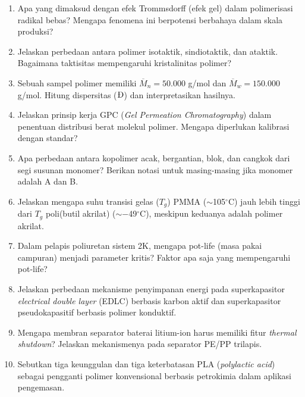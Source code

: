 \documentclass[12pt,a4paper,openany]{book}
\begin{document}
\begin{enumerate}

\item Apa yang dimaksud dengan efek Trommsdorff (efek gel) dalam polimerisasi radikal bebas? Mengapa fenomena ini berpotensi berbahaya dalam skala produksi?

\item Jelaskan perbedaan antara polimer isotaktik, sindiotaktik, dan ataktik. Bagaimana taktisitas mempengaruhi kristalinitas polimer?

\item Sebuah sampel polimer memiliki $\overline{M}_n = 50.000$ g/mol dan $\overline{M}_w = 150.000$ g/mol. Hitung dispersitas ($\text{\DH}$) dan interpretasikan hasilnya.

\item Jelaskan prinsip kerja GPC (\textit{Gel Permeation Chromatography}) dalam penentuan distribusi berat molekul polimer. Mengapa diperlukan kalibrasi dengan standar?

\item Apa perbedaan antara kopolimer acak, bergantian, blok, dan cangkok dari segi susunan monomer? Berikan notasi untuk masing-masing jika monomer adalah A dan B.

\item Jelaskan mengapa suhu transisi gelas ($T_g$) PMMA ($\sim$105$^{\circ}$C) jauh lebih tinggi dari $T_g$ poli(butil akrilat) ($\sim -$49$^{\circ}$C), meskipun keduanya adalah polimer akrilat.

\item Dalam pelapis poliuretan sistem 2K, mengapa pot-life (masa pakai campuran) menjadi parameter kritis? Faktor apa saja yang mempengaruhi pot-life?

\item Jelaskan perbedaan mekanisme penyimpanan energi pada superkapasitor \textit{electrical double layer} (EDLC) berbasis karbon aktif dan superkapasitor pseudokapasitif berbasis polimer konduktif.

\item Mengapa membran separator baterai litium-ion harus memiliki fitur \textit{thermal shutdown}? Jelaskan mekanismenya pada separator PE/PP trilapis.

\item Sebutkan tiga keunggulan dan tiga keterbatasan PLA (\textit{polylactic acid}) sebagai pengganti polimer konvensional berbasis petrokimia dalam aplikasi pengemasan.

\end{enumerate}
\end{document}
